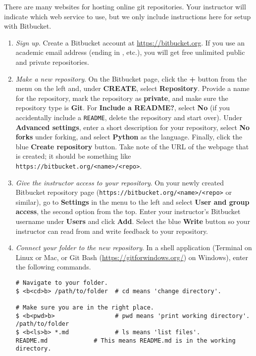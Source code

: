 There are many websites for hosting online git repositories.
Your instructor will indicate which web service to use, but we only include instructions here for setup with Bitbucket.

\begin{enumerate}
\item \emph{Sign up}.
\label{step:sign-up}
Create a Bitbucket account at \url{https://bitbucket.org}.
If you use an academic email address (ending in , etc.), you will get free unlimited public and private repositories.

\item \emph{Make a new repository}.
On the Bitbucket page, click the \textbf{+} button from the menu on the left and, under \textbf{CREATE}, select \textbf{Repository}.
Provide a name for the repository, mark the repository as \textbf{private}, and make sure the repository type is \textbf{Git}.
For \textbf{Include a README?}, select \textbf{No} (if you accidentally include a \texttt{README}, delete the repository and start over).
Under \textbf{Advanced settings}, enter a short description for your repository, select \textbf{No forks} under forking, and select \textbf{Python} as the language.
Finally, click the blue \textbf{Create repository} button.
Take note of the URL of the webpage that is created; it should be something like \texttt{https://bitbucket.org/<name>/<repo>}.

\item \emph{Give the instructor access to your repository}.
On your newly created Bitbucket repository page (\texttt{https://bitbucket.org/<name>/<repo>} or similar), go to \textbf{Settings} in the menu to the left and select \textbf{User and group access}, the second option from the top.
Enter your instructor's Bitbucket username under \textbf{Users} and click \textbf{Add}.
Select the blue \textbf{Write} button so your instructor can read from and write feedback to your repository.

\item \emph{Connect your folder to the new repository}.
\label{step:connect-folder}
In a shell application (Terminal on Linux or Mac, or Git Bash (\url{https://gitforwindows.org/}) on Windows), enter the following commands.

\begin{lstlisting}
# Navigate to your folder.
$ <b<cd>b> /path/to/folder  # cd means 'change directory'.

# Make sure you are in the right place.
$ <b<pwd>b>                 # pwd means 'print working directory'.
/path/to/folder
$ <b<ls>b> *.md             # ls means 'list files'.
README.md             # This means README.md is in the working directory.


\end{lstlisting}
\end{enumerate}
